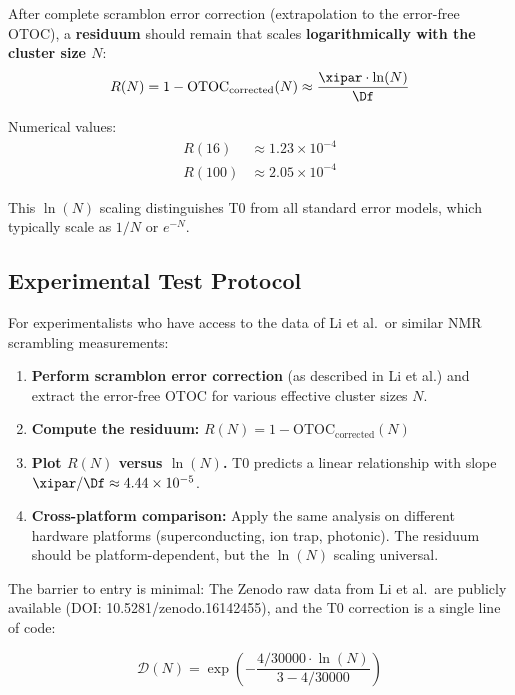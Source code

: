 \begin{experimentbox}
	After complete scramblon error correction (extrapolation to the error-free OTOC), a \textbf{residuum} should remain that scales \textbf{logarithmically with the cluster size $N$}:
	\begin{equation}
		R(N) = 1 - \text{OTOC}_{\text{corrected}}(N) \approx \frac{\xipar \cdot \ln(N)}{\Df}
		\label{eq:residuum}
	\end{equation}
	
	Numerical values:
	\begin{align}
		R(16) &\approx 1.23 \times 10^{-4} \\
		R(100) &\approx 2.05 \times 10^{-4}
	\end{align}
	
	This $\ln(N)$ scaling distinguishes T0 from all standard error models, which typically scale as $1/N$ or $e^{-N}$.
\end{experimentbox}

\subsection{Experimental Test Protocol}

For experimentalists who have access to the data of Li et al.\ or similar NMR scrambling measurements:

\begin{enumerate}
	\item \textbf{Perform scramblon error correction} (as described in Li et al.) and extract the error-free OTOC for various effective cluster sizes $N$.
	\item \textbf{Compute the residuum:} $R(N) = 1 - \text{OTOC}_{\text{corrected}}(N)$
	\item \textbf{Plot $R(N)$ versus $\ln(N)$.} T0 predicts a linear relationship with slope $\xipar/\Df \approx 4.44 \times 10^{-5}$.
	\item \textbf{Cross-platform comparison:} Apply the same analysis on different hardware platforms (superconducting, ion trap, photonic). The residuum should be platform-dependent, but the $\ln(N)$ scaling universal.
\end{enumerate}

The barrier to entry is minimal: The Zenodo raw data from Li et al.\ are publicly available (DOI: 10.5281/zenodo.16142455), and the T0 correction is a single line of code:

\begin{equation}
	\mathcal{D}(N) = \exp\left(-\frac{4/30000 \cdot \ln(N)}{3 - 4/30000}\right)
\end{equation}


